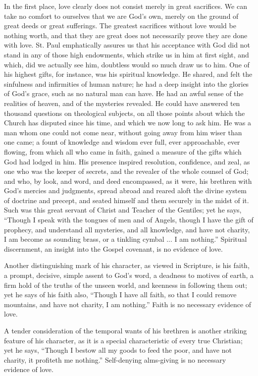 In the first place, love clearly does not consist merely in great
sacrifices. We can take no comfort to ourselves that we are God's own,
merely on the ground of great deeds or great sufferings. The greatest
sacrifices without love would be nothing worth, and that they are
great does not necessarily prove they are done with love. St. Paul
emphatically assures us that his acceptance with God did not stand in
any of those high endowments, which strike us in him at first sight,
and which, did we actually see him, doubtless would so much draw us to
him. One of his highest gifts, for instance, was his spiritual
knowledge. He shared, and felt the sinfulness and infirmities of human
nature; he had a deep insight into the glories of God's grace, such as
no natural man can have. He had an awful sense of the realities of
heaven, and of the mysteries revealed. He could have answered ten
thousand questions on theological subjects, on all those points about
which the Church has disputed since his time, and which we now long to
ask him. He was a man whom one could not come near, without going away
from him wiser than one came; a fount of knowledge and wisdom ever
full, ever approachable, ever flowing, from which all who came in
faith, gained a measure of the gifts which God had lodged in him. His
presence inspired resolution, confidence, and zeal, as one who was the
keeper of secrets, and the revealer of the whole counsel of God; and
who, by look, and word, and deed encompassed, as it were, his brethren
with God's mercies and judgments, spread abroad and reared aloft the
divine system of doctrine and precept, and seated himself and them
securely in the midst of it. Such was this great servant of Christ and
Teacher of the Gentiles; yet he says, ``Though I speak with the
tongues of men and of Angels, though I have the gift of prophecy, and
understand all mysteries, and all knowledge, and have not charity, I
am become as sounding brass, or a tinkling cymbal ... I am
nothing.'' Spiritual discernment, an insight into the Gospel
covenant, is no evidence of love.

Another distinguishing mark of his character, as viewed in
Scripture, is his faith, a prompt, decisive, simple assent to God's
word, a deadness to motives of earth, a firm hold of the truths of the
unseen world, and keenness in following them out; yet he says of his
faith also, ``Though I have all faith, so that I could remove
mountains, and have not charity, I am nothing.'' Faith is no
necessary evidence of love.

A tender consideration of the temporal wants of his brethren is
another striking feature of his character, as it is a special
characteristic of every true Christian; yet he says, ``Though I
bestow all my goods to feed the poor, and have not charity, it
profiteth me nothing.'' Self-denying alms-giving is no necessary
evidence of love.

